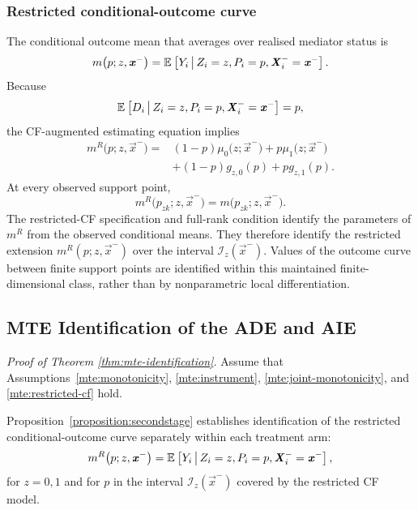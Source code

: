 \subsubsection{Restricted conditional-outcome curve}

The conditional outcome mean that averages over realised mediator status is
\[
    m
    \big(
        p;
        z,
        \boldsymbol{\mathit{x}}^-
    \big)
    =
    \mathbb{E}_{} \left[ 
        Y_i
     \, \middle\vert \, 
        Z_i=z,
        P_i=p,
        \boldsymbol{\mathit{X}}_i^-=\boldsymbol{\mathit{x}}^-
     \right].
\]
Because
\[
    \mathbb{E}_{} \left[ 
        D_i
     \, \middle\vert \, 
        Z_i=z,
        P_i=p,
        \boldsymbol{\mathit{X}}_i^-=\boldsymbol{\mathit{x}}^-
     \right]
    =
    p,
\]
the CF-augmented estimating equation implies
\[
    \begin{aligned}
    m^R
    \big(
        p;
        z,
        \vec x^-
    \big)
    ={}&
    (1-p)
    \mu_0
    \big(
        z;\vec x^-
    \big)
    +
    p
    \mu_1
    \big(
        z;\vec x^-
    \big)
    \\
    &+
    (1-p)
    g_{z,0}(p)
    +
    p
    g_{z,1}(p).
    \end{aligned}
    \label{eqn:restricted-outcome-curve}
\]
At every observed support point,
\[
    m^R
    \big(
        p_{zk};
        z,
        \vec x^-
    \big)
    =
    m
    \big(
        p_{zk};
        z,
        \vec x^-
    \big).
\]
The restricted-CF specification and full-rank condition identify the parameters of $m^R$ from the observed conditional means.
They therefore identify the restricted extension $m^R(p;z,\vec x^-)$ over the interval $\mathcal I_z(\vec x^-)$.
Values of the outcome curve between finite support points are identified within this maintained finite-dimensional class, rather than by nonparametric local differentiation.

\subsection{MTE Identification of the ADE and AIE}
\label{appendix:mte-ade-aie}
\textit{Proof of Theorem \ref{thm:mte-identification}.}
Assume that Assumptions~\ref{mte:monotonicity}, \ref{mte:instrument}, \ref{mte:joint-monotonicity}, and \ref{mte:restricted-cf} hold.

Proposition~\ref{proposition:secondstage} establishes identification of the restricted conditional-outcome curve separately within each treatment arm:
\[
    m^R
    \big(
        p;
        z,
        \boldsymbol{\mathit{x}}^-
    \big)
    =
    \mathbb{E}_{} \left[ 
        Y_i
     \, \middle\vert \, 
        Z_i=z,
        P_i=p,
        \boldsymbol{\mathit{X}}_i^-=\boldsymbol{\mathit{x}}^-
     \right],
\]
for $z=0,1$ and for $p$ in the interval $\mathcal I_z(\vec x^-)$ covered by the restricted CF model.

